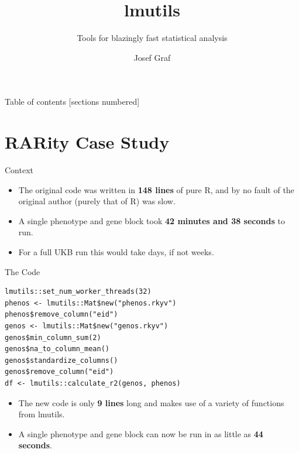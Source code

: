 \documentclass[10pt,handout]{beamer}
\title{lmutils}
\subtitle{Tools for blazingly fast statistical analysis}
\date{}
\author{Josef Graf}
\begin{document}
\maketitle

\begin{frame}{Table of contents}
  [sections numbered]
  \tableofcontents%
\end{frame}

\section[RARity Case Study]{RARity Case Study}

\begin{frame}{Context}
  \begin{itemize}[<+->]
    \item The original code was written in \textbf{148 lines} of pure R,
      and by no fault of the original author (purely that of R) was slow.
    \item A single phenotype and gene block took
      \textbf{42 minutes and 38 seconds} to run.
    \item For a full UKB run this would take days, if not weeks.
  \end{itemize}
\end{frame}

\begin{frame}[fragile]{The Code}
\begin{verbatim}
lmutils::set_num_worker_threads(32)
phenos <- lmutils::Mat$new("phenos.rkyv")
phenos$remove_column("eid")
genos <- lmutils::Mat$new("genos.rkyv")
genos$min_column_sum(2)
genos$na_to_column_mean()
genos$standardize_columns()
genos$remove_column("eid")
df <- lmutils::calculate_r2(genos, phenos)
\end{verbatim}
  \begin{itemize}
    \item<2-> The new code is only \textbf{9 lines} long and makes
      use of a variety of functions from lmutils.
    \item<3-> A single phenotype and gene block can now be run in
      as little as \textbf{44 seconds}.
  \end{itemize}
\end{frame}
\end{document}
